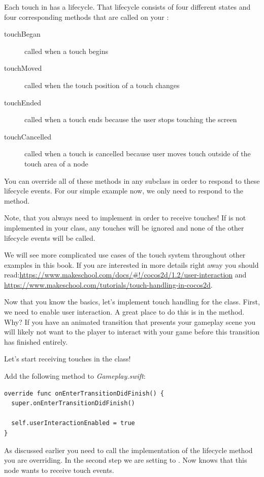 Each touch in \cocos{} has a lifecycle. That lifecycle consists of four
different states and four corresponding methods that are called on your
\ccnode{}:

\begin{description}
\item[touchBegan] called when a
touch begins
\item[touchMoved] called when the touch position of a touch
changes
\item[touchEnded] called when a touch ends because the user
stops touching the screen
\item[touchCancelled] called when a touch is cancelled
because user moves touch outside of the touch area of a node
\end{description}

You can override all of these methods in any \ccnode{} subclass in order to
respond to these lifecycle events. For our simple example now, we only need to
respond to the  method.

Note, that you always need to implement  in order to
receive touches! If  is not implemented in your class,
any touches will be ignored and none of the other lifecycle events will be
called.

\begin{details}
We will see more complicated use cases of the \cocos{} touch system throughout
other examples in this book. If you are interested in more details right away
you should
read:\url{https://www.makeschool.com/docs/#!/cocos2d/1.2/user-interaction} and
\url{https://www.makeschool.com/tutorials/touch-handling-in-cocos2d}.
\end{details}

Now that you know the basics, let's implement touch handling for the
 class. First, we need to enable user interaction. A great
place to do this is in the  method. Why?
If you have an animated transition that presents your gameplay scene you will
likely not want to the player to interact with your game before this transition
has finished entirely. 

Let's start receiving touches in the  class!

\begin{leftbar}
Add the following method to \textit{Gameplay.swift}:
\begin{lstlisting}
override func onEnterTransitionDidFinish() {
  super.onEnterTransitionDidFinish()
  
  self.userInteractionEnabled = true
}
\end{lstlisting}
\end{leftbar}
As discussed earlier you need to call the  implementation of
the lifecycle method you are overriding. In the second step we are setting
 to . Now \cocos{} knows
that this node wants to receive touch events. 

